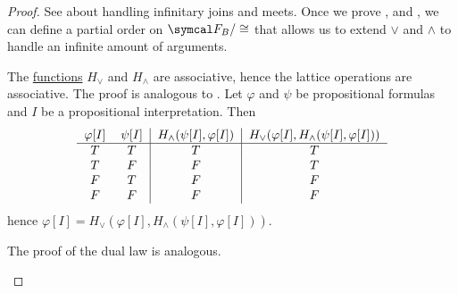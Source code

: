 \begin{proof}
  See  about handling infinitary joins and meets. Once we prove ,  and , we can define a partial order on \( \Cal{F}_B / \cong \) that allows us to extend \( \lor \) and \( \land \) to handle an infinite amount of arguments.

  \begin{description}
     The \hyperref[def:truth_functions]{functions} \( H_\lor \) and \( H_\land \) are associative, hence the lattice operations are associative.
     The proof is analogous to .
     Let \( \varphi \) and \( \psi \) be propositional formulas and \( I \) be a propositional interpretation. Then
    \begin{equation*}
      \begin{tabular}{c c | c | c}
        \( \varphi[I] \) & \( \psi[I] \) & \( H_\land(\psi[I], \varphi[I]) \) & \( H_\lor(\varphi[I], H_\land(\psi[I], \varphi[I])) \) \\
        \hline
        \( T \)          & \( T \)       & \( T \)                            & \( T \)    \\
        \( T \)          & \( F \)       & \( F \)                            & \( T \)    \\
        \( F \)          & \( T \)       & \( F \)                            & \( F \)    \\
        \( F \)          & \( F \)       & \( F \)                            & \( F \)
      \end{tabular}
    \end{equation*}
    hence \( \varphi[I] = H_\lor(\varphi[I], H_\land(\psi[I], \varphi[I])) \).

    The proof of the dual law is analogous.


\end{description}
\end{proof}
